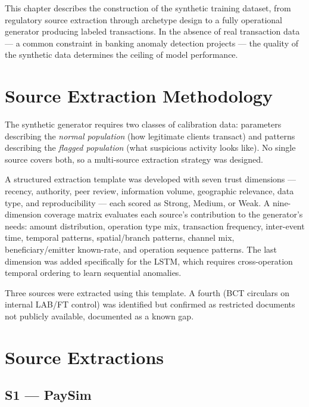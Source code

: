 This chapter describes the construction of the synthetic training dataset, from
regulatory source extraction through archetype design to a fully operational
generator producing labeled transactions. In the absence of real transaction data
--- a common constraint in banking anomaly detection projects --- the quality of
the synthetic data determines the ceiling of model performance.

\section{Source Extraction Methodology}

The synthetic generator requires two classes of calibration data: parameters
describing the \textit{normal population} (how legitimate clients transact) and
patterns describing the \textit{flagged population} (what suspicious activity looks
like). No single source covers both, so a multi-source extraction strategy was
designed.

A structured extraction template was developed with seven trust dimensions
--- recency, authority, peer review, information volume, geographic relevance,
data type, and reproducibility --- each scored as Strong, Medium, or Weak. A
nine-dimension coverage matrix evaluates each source's contribution to the
generator's needs: amount distribution, operation type mix, transaction frequency,
inter-event time, temporal patterns, spatial/branch patterns, channel mix,
beneficiary/emitter known-rate, and operation sequence patterns. The last dimension
was added specifically for the LSTM, which requires cross-operation temporal
ordering to learn sequential anomalies.

Three sources were extracted using this template. A fourth (BCT circulars on
internal LAB/FT control) was identified but confirmed as restricted documents
not publicly available, documented as a known gap.

\section{Source Extractions}

\subsection{S1 --- PaySim}

